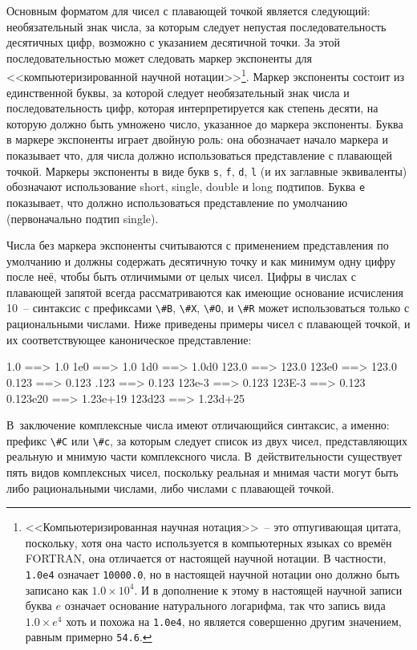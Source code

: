 Основным форматом для чисел с плавающей точкой является следующий: необязательный знак
числа, за которым следует непустая последовательность десятичных цифр, возможно с
указанием десятичной точки.  За этой последовательностью может следовать маркер экспоненты
для <<компьютеризированной научной нотации>>\footnote{<<Компьютеризированная научная
  нотация>>~-- это отпугивающая цитата, поскольку, хотя она часто используется в
  компьютерных языках со времён FORTRAN, она отличается от настоящей научной нотации.  В
  частности, \lstinline{1.0e4} означает \lstinline{10000.0}, но в настоящей научной нотации оно
  должно быть записано как $1.0 \times 10^4$.  И в дополнение к этому в настоящей научной
  записи буква $e$ означает основание натурального логарифма, так что запись вида
  $1.0 \times e^4$ хоть и похожа на \lstinline{1.0e4}, но является совершенно другим
  значением, равным примерно \lstinline{54.6}.}.  Маркер экспоненты состоит из единственной
буквы, за которой следует необязательный знак числа и последовательность цифр, которая
интерпретируется как степень десяти, на которую должно быть умножено число, указанное до
маркера экспоненты.  Буква в маркере экспоненты играет двойную роль: она обозначает начало
маркера и показывает что, для числа должно использоваться представление с плавающей
точкой.  Маркеры экспоненты в виде букв \lstinline{s}, \lstinline{f}, \lstinline{d}, \lstinline{l} (и их
заглавные эквиваленты) обозначают использование short, single, double и long подтипов.
Буква \lstinline{e} показывает, что должно использоваться представление по умолчанию
(первоначально подтип single).

Числа без маркера экспоненты считываются с применением представления по умолчанию и
должны содержать десятичную точку и как минимум одну цифру пос\-ле неё, чтобы быть отличимыми
от целых чисел.  Цифры в числах с плавающей запятой всегда рассматриваются как имеющие
основание исчисления 10~-- синтаксис с префиксами \lstinline{\#B}, \lstinline{\#X}, \lstinline{\#O}, и
\lstinline{\#R} может использоваться только с рациональными числами.  Ниже приведены примеры
чисел с плавающей точкой, и их соответствующее каноническое представление:

\begin{myverb}
1.0      ==> 1.0
1e0      ==> 1.0
1d0      ==> 1.0d0
123.0    ==> 123.0
123e0    ==> 123.0
0.123    ==> 0.123
.123     ==> 0.123
123e-3   ==> 0.123
123E-3   ==> 0.123
0.123e20 ==> 1.23e+19
123d23   ==> 1.23d+25
\end{myverb}

В~заключение комплексные числа имеют отличающийся синтаксис, а именно: префикс \lstinline{\#C}
или \lstinline{\#c}, за которым следует список из двух чисел, представляющих реальную и мнимую
части комплексного числа.  В~действительности существует пять видов комплексных чисел,
поскольку реальная и мнимая части могут быть либо рациональными числами, либо числами с
плавающей точкой.

